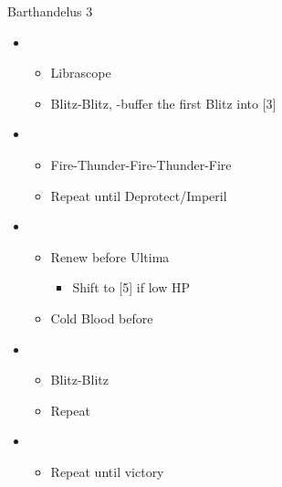 \begin{battle}{Barthandelus 3}
	\begin{itemize}
		\item \second
			\begin{itemize}
				\item Librascope
				\item Blitz-Blitz, \rav-buffer the first Blitz into [3]
			\end{itemize}
		\item \third
			\begin{itemize}
				\item Fire-Thunder-Fire-Thunder-Fire
				\item Repeat until Deprotect/Imperil
			\end{itemize}
		\item \first
			\begin{itemize}
				\item Renew before Ultima
					\begin{itemize}
						\item Shift to [5] if low HP
					\end{itemize}
				\item Cold Blood before \stagger
			\end{itemize}
		\item \sixth
			\begin{itemize}
				\item Blitz-Blitz
				\item Repeat
			\end{itemize}
		\item \second
			\begin{itemize}
				\item Repeat until victory
			\end{itemize}
	\end{itemize}
\end{battle}
\vfill

